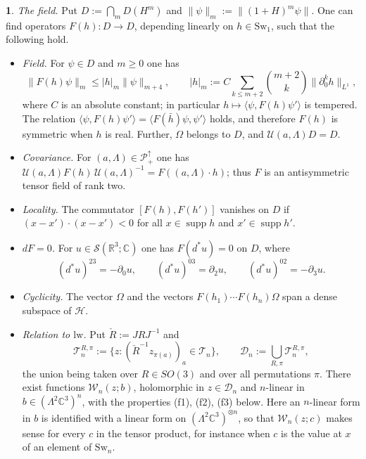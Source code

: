 \documentclass[11pt]{amsart}
\newcommand{\namedhead}{}
\theoremstyle{definition}
\newtheorem*{namedinner}{\namedhead}
\newenvironment{named}[1]{\renewcommand{\namedhead}{#1}\begin{namedinner}}{\end{namedinner}}
\begin{document}
\begin{named}{Theorem 3.3}
\emph{The field.}
Put $D:=\bigcap_mD(H^m)$ and $\|\psi\|_m:=\|(1+H)^m\psi\|$.
One can find operators $F(h)\colon D\to D$, depending linearly on $h\in\mathrm{Sw}_1$, such that the following hold.
\begin{itemize}
\item[(a)] \emph{Field.}
For $\psi\in D$ and $m\ge0$ one has
\begin{equation*}
\|F(h)\psi\|_m\le|h|_m\|\psi\|_{m+4},\qquad |h|_m:=C\sum_{k\le m+2}\binom{m+2}k\|\partial_0^kh\|_{L^1},
\end{equation*}
where $C$ is an absolute constant; in particular $h\mapsto\langle\psi,F(h)\psi'\rangle$ is tempered.
The relation $\langle\psi,F(h)\psi'\rangle=\langle F(\bar h)\psi,\psi'\rangle$ holds, and therefore $F(h)$ is symmetric when $h$ is real.
Further, $\Omega$ belongs to $D$, and $\mathcal U(a,\Lambda)D=D$.
\item[(b)] \emph{Covariance.}
For $(a,\Lambda)\in\mathcal P_+^\uparrow$ one has $\mathcal U(a,\allowbreak \Lambda)F(h)\,\allowbreak \mathcal U(a,\allowbreak \Lambda)^{-1}=\allowbreak F((a,\allowbreak \Lambda)\cdot h)$; thus $F$ is an antisymmetric tensor field of rank two.
\item[(c)] \emph{Locality.}
The commutator $[F(h),F(h')]$ vanishes on $D$ if $(x-x')\cdot(x-x')<0$ for all $x\in\operatorname{supp}h$ and $x'\in\operatorname{supp}h'$.
\item[(d)] \emph{$dF=0$.}
For $u\in\mathcal S(\mathbb R^3;\mathbb C)$ one has $F(d^*u)=0$ on $D$, where
\begin{equation*}
(d^*u)^{23}=-\partial_0u,\qquad (d^*u)^{03}=\partial_2u,\qquad (d^*u)^{02}=-\partial_3u.
\end{equation*}
\item[(e)] \emph{Cyclicity.}
The vector $\Omega$ and the vectors $F(h_1)\cdots F(h_n)\Omega$ span a dense subspace of $\mathcal H$.
\item[(f)] \emph{Relation to $\mathrm{lw}$.}
Put $\check R:=JRJ^{-1}$ and
\begin{equation*}
\mathcal T_n^{R,\pi}:=\{z:(\check R^{-1}z_{\pi(a)})_a\in\mathcal T_n\},\qquad \mathcal D_n:=\bigcup_{R,\pi}\mathcal T_n^{R,\pi},
\end{equation*}
the union being taken over $R\in SO(3)$ and over all permutations $\pi$.
There exist functions $\mathcal W_n(z;b)$, holomorphic in $z\in\mathcal D_n$ and $n$-linear in $b\in(\Lambda^2\mathbb C^3)^n$, with the properties (f1), (f2), (f3) below.
Here an $n$-linear form in $b$ is identified with a linear form on $(\Lambda^2\mathbb C^3)^{\otimes n}$, so that $\mathcal W_n(z;c)$ makes sense for every $c$ in the tensor product, for instance when $c$ is the value at $x$ of an element of $\mathrm{Sw}_n$.

\end{itemize}
\end{named}
\end{document}
